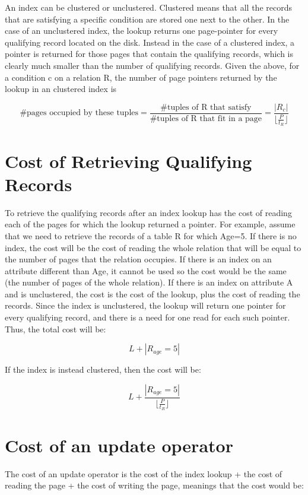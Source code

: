 \documentclass[12pt]{article}
\begin{document}
An index can be clustered or unclustered. Clustered means that all the records that are satisfying a specific condition are stored one next to the other. In the case of an unclustered index, the lookup returns one page-pointer for every qualifying record located on the disk. Instead in the case of a clustered index, a pointer is returned for those pages that contain the qualifying records, which is clearly much smaller than the number of qualifying records. Given the above, for a condition c on a relation R, the number of page pointers returned by the lookup in an clustered index is

$$
\text{\# pages occupied by these tuples} = \frac{\text{\# tuples of R that satisfy}}{\text{\# tuples of R that fit in a page}} = \frac{ |R_c| }{\lfloor\frac{P}{t_R}\rfloor}
$$

\section{Cost of Retrieving Qualifying Records}
To retrieve the qualifying records after an index lookup has the cost of reading each of the pages for which the lookup returned a pointer. For example, assume that we need to retrieve the records of a table R for which Age=5. If there is no index, the cost will be the cost of reading the whole relation that will be equal to the number of pages that the relation occupies. If there is an index on an attribute different than Age, it cannot be used so the cost would be the same (the number of pages of the whole relation). If there is an index on attribute A and is unclustered, the cost is the cost of the lookup, plus the cost of reading the records. Since the index is unclustered, the lookup will return one pointer for every qualifying record, and there is a need for one read for each such pointer. Thus, the total cost will be:

$$
L + |R_{age}=5|
$$

If the index is instead clustered, then the cost will be:

$$
L + \frac{ |R_{age}=5| }{\lfloor\frac{P}{t_R}\rfloor}
$$

\section{Cost of an update operator}

The cost of an update operator is the cost of the index lookup + the cost of reading the page + the cost of writing the page, meanings that the cost would be:
\end{document}
